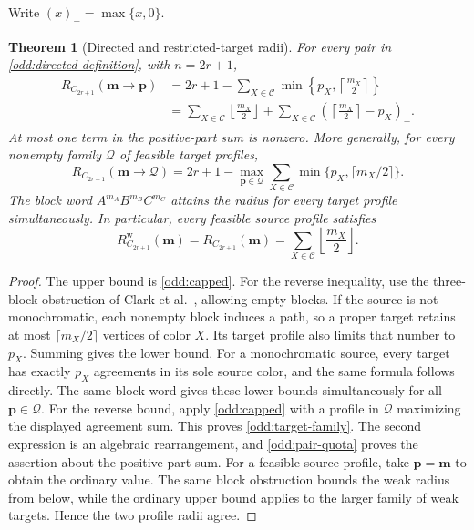 \documentclass[11pt,reqno]{amsart}
\numberwithin{equation}{section}
\newtheorem{theorem}{Theorem}[section]
\theoremstyle{definition}
\theoremstyle{remark}
\begin{document}
Write $(x)_+=\max\{x,0\}$.
\begin{theorem}[Directed and restricted-target radii]\label{odd:directed}
For every pair in \cref{odd:directed-definition}, with $n=2r+1$,
\begin{align*}
 R_{C_{2r+1}}(\mathbf m\to\mathbf p)
 &=2r+1-\sum_{X\in\mathcal C}
       \min\left\{p_X,\left\lceil\frac{m_X}{2}\right\rceil\right\}\\
 &=\sum_{X\in\mathcal C}\left\lfloor\frac{m_X}{2}\right\rfloor
   +\sum_{X\in\mathcal C}
       \left(\left\lceil\frac{m_X}{2}\right\rceil-p_X\right)_+.
\end{align*}
At most one term in the positive-part sum is nonzero.
More generally, for every nonempty family $\mathcal Q$ of feasible
target profiles,
\begin{equation}\label{odd:target-family}
R_{C_{2r+1}}(\mathbf m\to\mathcal Q)
=2r+1-\max_{\mathbf p\in\mathcal Q}
 \sum_{X\in\mathcal C}\min\{p_X,\lceil m_X/2\rceil\}.
\end{equation}
The block word $A^{m_A}B^{m_B}C^{m_C}$ attains the radius for every
target profile simultaneously.
In particular, every feasible source profile satisfies
\[
 R^{\mathrm w}_{C_{2r+1}}(\mathbf m)
 =R_{C_{2r+1}}(\mathbf m)
 =\sum_{X\in\mathcal C}\left\lfloor\frac{m_X}{2}\right\rfloor.
\]
\end{theorem}
\begin{proof}
The upper bound is \cref{odd:capped}. For the reverse inequality,
use the three-block obstruction of
Clark et al.~\cite[Proposition~3.5]{clark2006}, allowing empty blocks.
If the source is not monochromatic, each nonempty block induces a
path, so a proper target retains at most $\lceil m_X/2\rceil$
vertices of color $X$. Its target profile also limits that number
to $p_X$. Summing gives the lower bound. For a monochromatic
source, every target has exactly $p_X$ agreements in its sole source
color, and the same formula follows directly.
The same block word gives these lower bounds simultaneously for all
$\mathbf p\in\mathcal Q$. For the reverse bound, apply
\cref{odd:capped} with a profile in $\mathcal Q$ maximizing the
displayed agreement sum. This proves \eqref{odd:target-family}.
The second expression is an algebraic rearrangement, and
\eqref{odd:pair-quota} proves the assertion about the positive-part
sum. For a feasible source profile, take $\mathbf p=\mathbf m$
to obtain the ordinary value. The same block obstruction bounds
the weak radius from below, while the ordinary upper bound applies
to the larger family of weak targets. Hence the two profile radii agree.
\end{proof}
\end{document}
